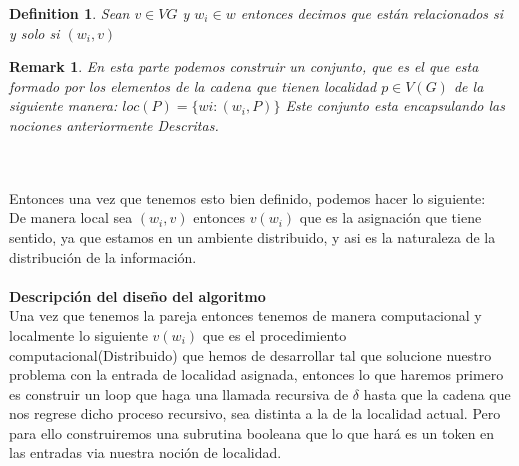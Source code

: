 \documentclass[10pt]{article}
\newtheorem*{remark}{Remark}
\newtheorem{definition}{Definition}[section]
\begin{document}
    \begin{definition}
        Sean $v\in VG$ y $w_{i} \in w$ entonces decimos que están relacionados
        si y solo si $(w_{i}, v)$
    \end{definition}
    \space
    \begin{remark}
        En esta parte podemos construir un conjunto, que es el que esta formado por los elementos de la cadena que tienen localidad $p\in V(G)$
        de la siguiente manera: $loc(P) = \{w{i}: (w_{i},P) \}$
        Este conjunto esta encapsulando las nociones anteriormente Descritas.
    \end{remark}
    \\
    \\
    Entonces una vez que tenemos esto bien definido, podemos hacer lo siguiente:\\
    De manera local sea $(w_{i},v)$ entonces $v(w_{i})$ que es la asignación que tiene
    sentido, ya que estamos en un ambiente distribuido, y asi es la naturaleza de la distribución de
    la información.\\
    \\
    \textbf{Descripción del diseño del algoritmo}\\
    Una vez que tenemos la pareja entonces tenemos de manera computacional y localmente  lo siguiente $v(w_{i})$ que es el
    procedimiento computacional(Distribuido) que hemos de desarrollar tal que solucione nuestro problema con la entrada
    de localidad asignada, entonces lo que haremos primero es construir un loop que haga una llamada recursiva de $\delta$
    hasta que la cadena que nos regrese dicho proceso recursivo, sea distinta a la de la localidad actual.
    Pero para ello construiremos una subrutina booleana que lo que hará es un token en las entradas via nuestra noción
    de localidad.
    \\

    \begin{algorithm}
        \begin{algorithmic}[1]
            \ELSE
            \ENDIF
        \end{algorithmic}
        \caption{$func\char95 boolean(w_{i},p)$\label{lss}}
    \end{algorithm}
    \\\\
\end{document}
